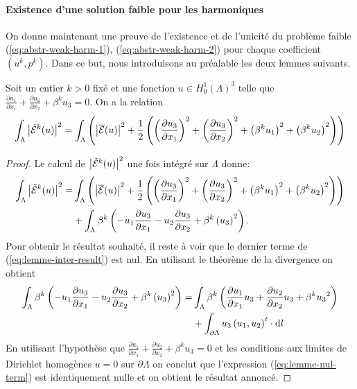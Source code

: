 \paragraph{Existence d'une solution faible pour les harmoniques}
On donne maintenant une preuve de l'existence et de l'unicité du
problème faible (\ref{eq:abstr-weak-harm-1}),
(\ref{eq:abstr-weak-harm-2}) pour chaque coefficient $(u^k,p^k)$. Dans ce
but, nous introduisons au préalable les deux lemmes suivants.

\begin{lemme}\label{lem:1}
Soit un entier $k > 0$ fixé et une fonction $u \in H^1_0(\Lambda)^3$
telle que $\frac{\partial u_1}{\partial x_1} + \frac{\partial
  u_2}{\partial x_2} + \beta^k u_3 = 0$. On a la relation
\begin{equation}
\int_\Lambda \left\lvert \tilde{\mathcal E}^k(u) \right\rvert^2 = \int_\Lambda
\left( \left\lvert \overline{\mathcal E}(u) \right\rvert^2 +
  \frac{1}{2}\left( \left( \frac{\partial u_3}{\partial x_1} \right)^2 +
    \left( \frac{\partial u_3}{\partial x_2} \right)^2 +
    \left( \beta^k u_1 \right)^2  + \left( \beta^k u_2 \right)^2 \right) \right)
\end{equation}
\end{lemme}

\begin{proof}
  Le calcul de $\left\lvert \tilde{\mathcal E}^k(u) \right\rvert^2$ une fois
  intégré sur $\Lambda$ donne:
  \begin{align}
    \int_\Lambda \left\lvert \tilde{\mathcal E}^k(u) \right\rvert^2 =
    &\int_\Lambda \left( \left\lvert \overline{\mathcal E}(u) \right\rvert^2
    + \frac{1}{2}\left( 
      \left( \frac{\partial u_3}{\partial x_1} \right)^2
      + \left( \frac{\partial u_3}{\partial x_2} \right)^2
      + \left( \beta^k u_1 \right)^2
      + \left( \beta^k u_2 \right)^2 \right) \right)\nonumber\\
    &+ \int_\Lambda \beta^k\left( 
      - u_1 \frac{\partial u_3}{\partial x_1}
      - u_2 \frac{\partial u_3}{\partial x_2}
      + \beta^k\left( u_3 \right)^2
     \right).\label{eq:lemme-inter-result}
  \end{align}
  Pour obtenir le résultat souhaité, il reste à voir que le
  dernier terme de (\ref{eq:lemme-inter-result}) est nul.
  En utilisant le théorème de la divergence on obtient
  \begin{align}
    \int_\Lambda \beta^k\left( 
      - u_1 \frac{\partial u_3}{\partial x_1}
      - u_2 \frac{\partial u_3}{\partial x_2}
      + \beta^k\left( u_3 \right)^2 \right) =
    &\int_\Lambda\beta^k\left( 
        \frac{\partial u_1}{\partial x_1}u_3
      + \frac{\partial u_2}{\partial x_2}u_3 +
      \beta^k{u_3}^2 \right)\\
    &+ \int_{\partial \Lambda} u_3\left( u_1,
      u_2 \right)^t\cdot\mathrm dl\label{eq:lemme-nul-term}
  \end{align}
  En utilisant l'hypothèse que $\frac{\partial u_1}{\partial x_1} +
  \frac{\partial u_2}{\partial x_2} + \beta^k u_3 = 0$ et les
  conditions aux limites de Dirichlet homogènes $u = 0$ sur
  $\partial \Lambda$ on conclut que l'expression
  (\ref{eq:lemme-nul-term}) est identiquement nulle et on obtient le
  résultat annoncé.
\end{proof}

